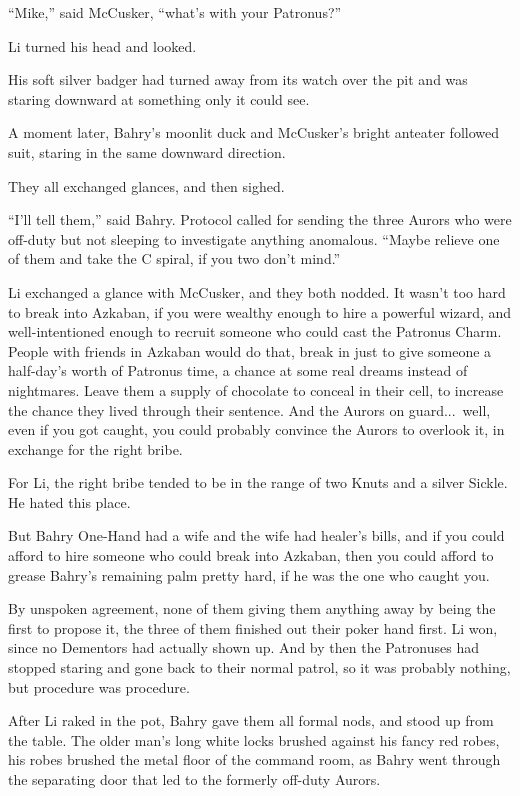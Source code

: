“Mike,” said McCusker, “what’s with your Patronus?”

Li turned his head and looked.

His soft silver badger had turned away from its watch over the pit and was staring downward at something only it could see.

A moment later, Bahry’s moonlit duck and McCusker’s bright anteater followed suit, staring in the same downward direction.

They all exchanged glances, and then sighed.

“I’ll tell them,” said Bahry. Protocol called for sending the three Aurors who were off-duty but not sleeping to investigate anything anomalous. “Maybe relieve one of them and take the C spiral, if you two don’t mind.”

Li exchanged a glance with McCusker, and they both nodded. It wasn’t too hard to break into Azkaban, if you were wealthy enough to hire a powerful wizard, and well-intentioned enough to recruit someone who could cast the Patronus Charm. People with friends in Azkaban would do that, break in just to give someone a half-day’s worth of Patronus time, a chance at some real dreams instead of nightmares. Leave them a supply of chocolate to conceal in their cell, to increase the chance they lived through their sentence. And the Aurors on guard...\ well, even if you got caught, you could probably convince the Aurors to overlook it, in exchange for the right bribe.

For Li, the right bribe tended to be in the range of two Knuts and a silver Sickle. He hated this place.

But Bahry One-Hand had a wife and the wife had healer’s bills, and if you could afford to hire someone who could break into Azkaban, then you could afford to grease Bahry’s remaining palm pretty hard, if he was the one who caught you.

By unspoken agreement, none of them giving them anything away by being the first to propose it, the three of them finished out their poker hand first. Li won, since no Dementors had actually shown up. And by then the Patronuses had stopped staring and gone back to their normal patrol, so it was probably nothing, but procedure was procedure.

After Li raked in the pot, Bahry gave them all formal nods, and stood up from the table. The older man’s long white locks brushed against his fancy red robes, his robes brushed the metal floor of the command room, as Bahry went through the separating door that led to the formerly off-duty Aurors.

